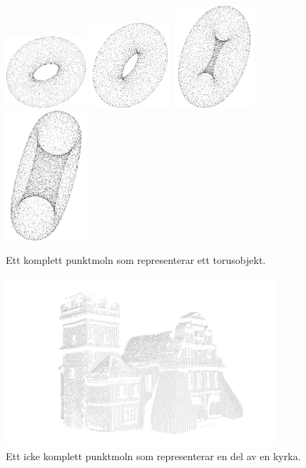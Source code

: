 \begin{figure}[H]
	\centering
	\includegraphics[width=30mm]{figures/Point_cloud_torus1.png}
	\includegraphics[width=30mm]{figures/Point_cloud_torus2.png}
	\includegraphics[width=30mm]{figures/Point_cloud_torus3.png}
	\includegraphics[width=30mm]{figures/Point_cloud_torus4.png}
	\caption{Ett komplett punktmoln som representerar ett torusobjekt.}
	\label{fig:point_cloud_torus}
\end{figure}

\begin{figure}[H]
	\centering
	\includegraphics[width=100mm]{figures/icke_komplett_moln_kyrka.png}
	\caption{Ett icke komplett punktmoln som representerar en del av en kyrka.}
	\label{fig:point_cloud_church}
\end{figure}

